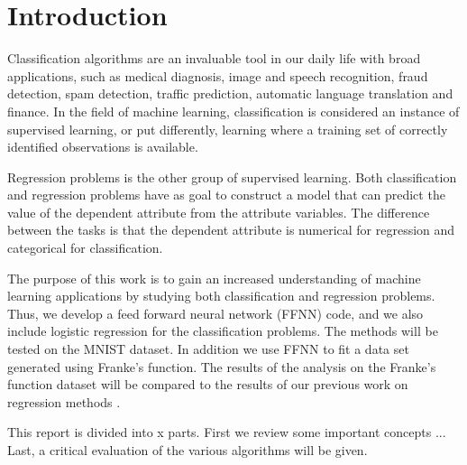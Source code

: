 \documentclass[../main.tex]{subfiles}
\begin{document}
\section{Introduction}
Classification algorithms are an invaluable tool in our daily life with broad applications, such as medical diagnosis, image and speech recognition, fraud detection, spam detection, traffic prediction, automatic language translation and finance. In the field of machine learning, classification is considered an instance of supervised learning, or put differently, learning where a training set of correctly identified observations is available.

Regression problems is the other group of supervised learning. Both classification and regression problems have as goal to construct a model that can predict the value of the dependent attribute from the attribute variables. The difference between the tasks is that the dependent attribute is numerical for regression and categorical for classification.

The purpose of this work is to gain an increased understanding of machine learning applications by studying both classification and regression problems. Thus, we develop a feed forward neural network (FFNN) code, and we also include logistic regression for the classification problems. The methods will be tested on the MNIST dataset. In addition we use FFNN to fit a data set generated using Franke’s function. The results of the analysis on the Franke's function dataset will be compared to the results of our previous work on regression methods \cite{project2}. 

This report is divided into x parts. First we review some important concepts ... Last, a critical evaluation of the various algorithms will be given. 
\end{document}
